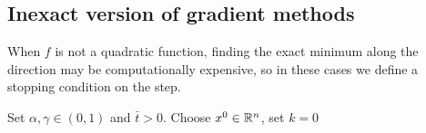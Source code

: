 \subsection{Inexact version of gradient methods}

When $f$ is not a quadratic function, finding the exact minimum along the direction may be computationally expensive, so in these cases we define a stopping condition on the step.

\begin{algorithm}[htbp]
\caption{Gradient method with the Armijo inexact line search}
Set $\alpha, \gamma \in (0,1)$ and $\bar{t} > 0$. Choose $x^0 \in \mathbb{R}^n$, set $k = 0$\;
\end{algorithm}
